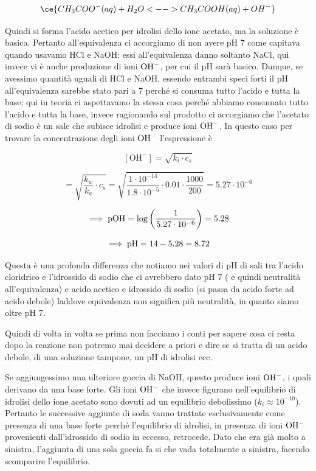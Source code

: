 $$\ce{CH_3COO^-(aq) + H_2O <--> CH_3COOH(aq) + OH^-}$$

Quindi si forma l'acido acetico per idrolisi dello ione acetato, ma la soluzione è basica. Pertanto all'equivalenza ci accorgiamo di non avere pH 7 come capitava quando usavamo HCl e NaOH: essi all'equivalenza danno soltanto NaCl, qui invece vi è anche produzione di ioni $\rm OH^-$, per cui il pH sarà basico. Dunque, se avessimo quantità uguali di HCl e NaOH, essendo entrambi speci forti il pH all'equivalenza sarebbe stato pari a 7 perché si consuma tutto l'acido e tutta la base; qui in teoria ci aspettavamo la stessa cosa perché abbiamo consumato tutto l'acido e tutta la base, invece ragionando sul prodotto ci accorgiamo che l'acetato di sodio è un sale che subisce idrolisi e produce ioni $\rm OH^-$. In questo caso per trovare la concentrazione degli ioni $\rm OH^-$ l'espressione è

$$[\text{OH}^-]=\sqrt{k_i \cdot c_s}$$

$$=\sqrt{\frac{k_w}{k_a} \cdot c_s}
=\sqrt{\frac{1 \cdot 10^{-14}}{1.8 \cdot 10^{-5}} \cdot 0.01 \cdot \frac{1000}{200}}=5.27 \cdot 10^{-6}$$

$$\implies \rm pOH=\log{\left(\frac{1}{5.27 \cdot 10^{-6}}\right)}=5.28$$

$$\implies \rm pH=14-5.28=8.72$$

Questa è una profonda differenza che notiamo nei valori di pH di sali tra l'acido cloridrico e l'idrossido di sodio che ci avrebbero dato pH 7 ( e quindi neutralità all'equivalenza) e acido acetico e idrossido di sodio (si passa da acido forte ad acido debole) laddove equivalenza non significa più neutralità, in quanto siamo oltre pH 7.

Quindi di volta in volta se prima non facciamo i conti per sapere cosa ci resta dopo la reazione non potremo mai decidere a priori e dire se si tratta di un acido debole, di una soluzione tampone, un pH di idrolisi ecc.

\vspace{0.2cm}Se aggiungessimo una ulteriore goccia di NaOH, questo produce ioni $\rm OH^-$, i quali derivano da una base forte. Gli ioni $\rm OH^-$ che invece figurano nell'equilibrio di idrolisi dello ione acetato sono dovuti ad un equilibrio debolissimo ($k_i \approx 10^{-10}$). Pertanto le successive aggiunte di soda vanno trattate esclusivamente come presenza di una base forte perché l'equilibrio di idrolisi, in presenza di ioni $\rm OH^-$ provenienti dall'idrossido di sodio in eccesso, retrocede. Dato che era già molto a sinistra, l'aggiunta di una sola goccia fa si che vada totalmente a sinistra, facendo scomparire l'equilibrio.

